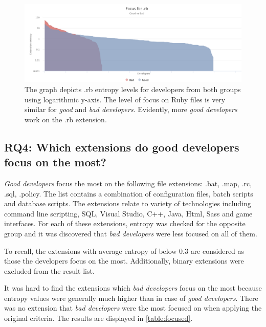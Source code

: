\begin{figure}[htpb]
  \centering
  \includegraphics[width=1\textwidth]{figures/rb_log}
  \caption[Focus for .rb]{The graph depicts .rb entropy levels for developers from both groups using logarithmic y-axis. The level of focus on Ruby files is very similar for \textit{good} and \textit{bad developers}. Evidently, more \textit{good developers} work on the .rb extension.} \label{fig:rb_log}
\end{figure}

\subsection{RQ4: Which extensions do good developers focus on the most?}

\textit{Good developers} focus the most on the following file extensions: .bat, .map, .rc, .sql, .policy.   The list contains a combination of configuration files, batch scripts and database scripts. The extensions relate to variety of technologies including command line scripting, SQL, Visual Studio, C++, Java, Html, Sass and game interfaces. For each of these extensions, entropy was checked for the opposite group and it was discovered that \textit{bad developers} were less focused on all of them. \par

To recall, the extensions with average entropy of below 0.3 are considered as those the developers focus on the most. Additionally, binary extensions were excluded from the result list. \par

It was hard to find the extensions which \textit{ bad developers} focus on the most because entropy values were generally much higher than in case of \textit{good developers}. There was no extension that \textit{bad developers }were the most focused on when applying the original criteria. The results are displayed in \autoref{table:focused}. 

